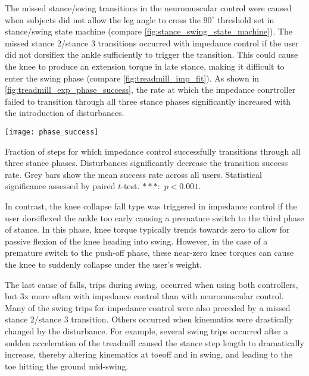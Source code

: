 The missed stance/swing transitions in the neuromuscular control were caused
when subjects did not allow the leg angle to cross the $90^\circ$ threshold set
in stance/swing state machine (compare \cref{fig:stance_swing_state_machine}).
The missed stance 2/stance 3 transitions occurred with impedance control if the
user did not dorsiflex the ankle sufficiently to trigger the transition. This
could cause the knee to produce an extension torque in late stance, making it
difficult to enter the swing phase (compare \cref{fig:treadmill_imp_fit}). As
shown in \cref{fig:treadmill_exp_phase_success}, the rate at which the impedance
conrtroller failed to transition through all three stance phases significantly
increased with the introduction of disturbances.
\begin{marginfigure}[-2.5in]
    \centering 
    \texttt{[image: phase\_success]}
    \caption{Fraction of steps for which impedance control successfully
    transitions through all three stance phases. Disturbances significantly
    decrease the transition success rate. Grey bars show the mean success rate
    across all users. Statistical significance assessed by paired $t$-test.
    $***$:~$p < 0.001$.}\label{fig:treadmill_exp_phase_success}
\end{marginfigure}

In contrast, the knee collapse fall type was triggered in impedance control if
the user dorsiflexed the ankle too early causing a premature switch to the third
phase of stance. In this phase, knee torque typically trends towards zero to
allow for passive flexion of the knee heading into swing. However, in the case
of a premature switch to the push-off phase, these near-zero knee torques can
cause the knee to suddenly collapse under the user's weight. 

The last cause of falls, trips during swing, occurred when using both
controllers, but 3x more often with impedance control than with neuromuscular
control. Many of the swing trips for impedance control were also preceded by a
missed stance 2/stance 3 transition. Others occurred when kinematics were
drastically changed by the disturbance. For example, several swing trips
occurred after a sudden acceleration of the treadmill caused the stance step
length to dramatically increase, thereby altering kinematics at toeoff and in
swing, and leading to the toe hitting the ground mid-swing.

